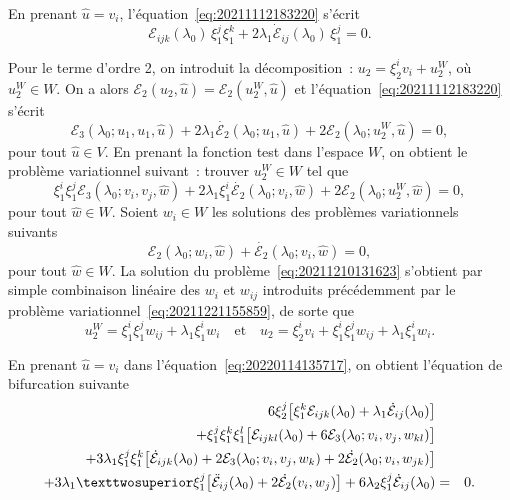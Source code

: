 \documentclass[12pt, final]{amsart}
\begin{document}
En prenant \(\hat{u}=v_i\), l'équation~\eqref{eq:20211112183220} s'écrit
\begin{equation}
  \label{eq:20220216140121}
  \mathcal E_{ijk}(\lambda _0)\,\xi _1^j\xi _1^k+2\lambda _1\dot{\mathcal E}_{ij}(\lambda _0)\,\xi _1^j=0.
\end{equation}

Pour le terme d'ordre 2, on introduit la décomposition~:
\(u_2=\xi _2^iv_i+u_2^W\), où \(u_2^W\in W\). On a alors
\(\mathcal E_2(u_2, \hat{u})=\mathcal E_2(u_2^W, \hat{u})\) et l'équation~\eqref{eq:20211112183220}
s'écrit
\begin{equation}
  \mathcal E_3(\lambda _0; u_1, u_1, \hat{u})+2\lambda _1\dot{\mathcal E_2}(\lambda _0; u_1, \hat{u})
  +2\mathcal E_2(\lambda _0; u_2^W, \hat{u})=0,
\end{equation}
pour tout \(\hat{u}\in V\). En prenant la fonction test dans l'espace \(W\), on
obtient le problème variationnel suivant~: trouver \(u_2^W\in W\) tel que
\begin{equation}
  \label{eq:20211210131623}
  \xi _1^i\xi _1^j\mathcal E_3(\lambda _0; v_i, v_j, \hat{w})
  +2\lambda _1\xi _1^i\dot{\mathcal E_2}(\lambda _0; v_i, \hat{w})
  +2\mathcal E_2(\lambda _0; u_2^W, \hat{w})=0,
\end{equation}
pour tout \(\hat{w}\in W\). Soient \(w_i\in W\) les solutions des problèmes
variationnels suivants
\begin{equation}
  \label{eq:20220208143055}
  \mathcal E_2(\lambda _0; w_i, \hat{w})+\dot{\mathcal E_2}(\lambda _0; v_i, \hat{w})=0,
\end{equation}
pour tout \(\hat{w}\in W\). La solution du problème~\eqref{eq:20211210131623}
s'obtient par simple combinaison linéaire des \(w_i\) et \(w_{ij}\) introduits
précédemment par le problème variationnel~\eqref{eq:20211221155859}, de sorte
que
\begin{equation}
  \label{eq:20220124135324}
  u_2^W=\xi _1^i\xi _1^jw_{ij}+\lambda _1\xi _1^i w_i
  \quad\text{et}\quad
  u_2=\xi _2^iv_i+\xi _1^i\xi _1^jw_{ij}+\lambda _1\xi _1^i w_i.
\end{equation}

En prenant \(\hat{u}=v_i\) dans l'équation~\eqref{eq:20220114135717}, on
obtient l'équation de bifurcation suivante
\begin{eqnarray}
  \notag
  6\xi _2^j\bigl[\xi _1^k\mathcal E_{ijk}(\lambda _0)+\lambda _1\dot{\mathcal E}_{ij}(\lambda _0)\bigr]&&\\
  \notag
  +\xi _1^j\xi _1^k\xi _1^l\bigl[\mathcal E_{ijkl}(\lambda _0)+6\mathcal E_3(\lambda _0; v_i, v_j, w_{kl})\bigr]&&\\
  \notag
    +3\lambda _1\xi _1^j\xi _1^k\bigl[\dot{\mathcal E}_{ijk}(\lambda _0)+2\mathcal E_3(\lambda _0; v_i, v_j, w_k)
    +2\dot{\mathcal E_2}(\lambda _0; v_i, w_{jk})\bigr]&&\\
    \label{eq:20220210143805}
    +3\lambda _1²\xi _1^j\bigl[\ddot{\mathcal E}_{ij}(\lambda _0)+2\dot{\mathcal E_2}(v_i, w_j)\bigr]
    +6\lambda _2\xi _1^j\dot{\mathcal E}_{ij}(\lambda _0)
    &=&0.
\end{eqnarray}
\end{document}
